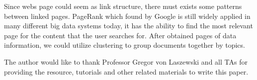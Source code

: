 \documentclass[sigconf]{acmart}
\begin{document}
Since webs page could seem as link structure, there must exists some patterns between linked pages. PageRank which found by Google is still widely applied in many different big data systems today, it has the ability to find the most relevant page for the content that the user searches for. After obtained pages of data information, we could utilize clustering to group documents together by topics.

\begin{acks}
The author would like to thank Professor Gregor von Laszewski and all TAs for providing the resource, tutorials and other related materials to write this paper.

\end{acks}


 
\end{document}
